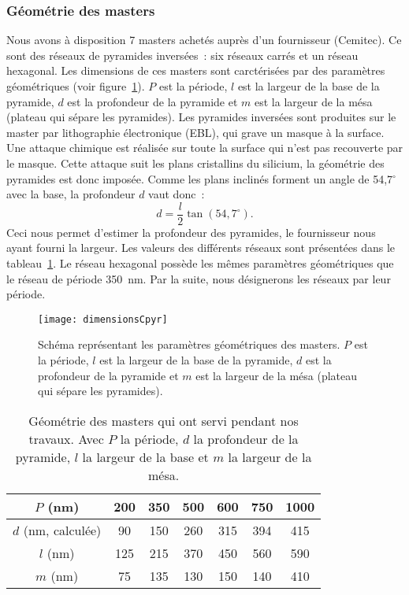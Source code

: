	\subsubsection{Géométrie des masters}
Nous avons à disposition 7 masters achetés auprès d’un fournisseur (Cemitec). Ce sont des réseaux de pyramides inversées~: six réseaux carrés et un réseau hexagonal. Les dimensions de ces masters sont carctérisées par des paramètres géométriques (voir figure~\ref{dimensionsCpyrChapter3}). $P$ est la période, $l$ est la largeur de la base de la pyramide, $d$ est la profondeur de la pyramide et $m$ est la largeur de la mésa (plateau qui sépare les pyramides). Les pyramides inversées sont produites sur le master par lithographie électronique (EBL), qui grave un masque à la surface. Une attaque chimique est réalisée sur toute la surface qui n'est pas recouverte par le masque. Cette attaque suit les plans cristallins du silicium, la géométrie des pyramides est donc imposée. Comme les plans inclinés forment un angle de 54,7$^\circ$ avec la base, la profondeur $d$ vaut donc~:
\begin{equation}
d = \dfrac{l}{2}\tan(54,7^\circ).
\end{equation}
Ceci nous permet d’estimer la profondeur des pyramides, le fournisseur nous ayant fourni la largeur. Les valeurs des différents réseaux sont présentées dans le tableau~\ref{tGeometrie}. Le réseau hexagonal possède les mêmes paramètres géométriques que le réseau de période 350~nm. Par la suite, nous désignerons les réseaux par leur période.\par 

\begin{figure}[!htb]
\centering
\texttt{[image: dimensionsCpyr]}
\caption{Schéma représentant les paramètres géométriques des masters. $P$ est la période, $l$ est la largeur de la base de la pyramide, $d$ est la profondeur de la pyramide et $m$ est la largeur de la mésa (plateau qui sépare les pyramides).}
\label{dimensionsCpyrChapter3}
\end{figure}

\begin{table}[!htb]
\centering
\begin{tabular}{ccccccc}
\hline
$P$ (nm) & 200 & 350 & 500 & 600 & 750 & 1000\\
\hline
$d$ (nm, calculée) & 90 & 150 & 260 & 315 & 394 & 415\\
$l$ (nm) & 125 & 215 & 370 & 450 & 560 & 590\\
$m$ (nm) & 75 & 135 & 130 & 150 & 140 & 410\\
\hline
\end{tabular}
\caption{Géométrie des masters qui ont servi pendant nos travaux. Avec $P$ la période, $d$ la profondeur de la pyramide, $l$ la largeur de la base et $m$ la largeur de la mésa.}
\label{tGeometrie}
\end{table}

